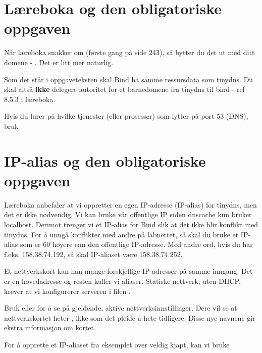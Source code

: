 \section{Læreboka og den obligatoriske oppgaven}

Når læreboka snakker om  (første gang på side 243),
så bytter du det ut med ditt domene - . Det er litt 
mer naturlig.

Som det står i oppgaveteksten skal Bind ha samme ressursdata som
tinydns. Du skal altså \textbf{ikke} delegere autoritet for et barnedomene fra
tinydns til bind - ref 8.5.3 i læreboka.

Hvis du lurer på hvilke tjenester (eller prosesser)
som lytter på port 53 (DNS), bruk


\section{IP-alias og den obligatoriske oppgaven}

Læreboka anbefaler at vi oppretter en egen IP-adresse (IP-alias) for tinydns, 
men det er ikke nødvendig. Vi kan bruke vår offentlige IP siden dnscache kun bruker localhost.
Derimot trenger vi et IP-alias for Bind slik at det ikke blir konflikt med tinydns.
For å unngå konflikter med andre på labnettet, så skal du bruke et IP-alias
som er 60 høyere enn den offentlige IP-adresse. Med andre ord, hvis du 
har f.eks. 158.38.74.192, så skal IP-aliaset være 158.38.74.252.

Et nettverkskort kan han mange forskjellige IP-adresser på samme inngang. 
Det er en hovedadresse og resten kaller vi aliaser. 
Statiske nettverk, uten DHCP, krever at vi konfigurerer 
serveren i filen . 

Bruk  eller  for å se på gjeldende, aktive nettverksinnstillinger.
Dere vil se at nettverkskortet heter , ikke  som det pleide 
å hete tidligere. Disse nye navnene gir ekstra informasjon om kortet.

For å opprette et IP-aliaset fra eksemplet over veldig kjapt, kan vi bruke


